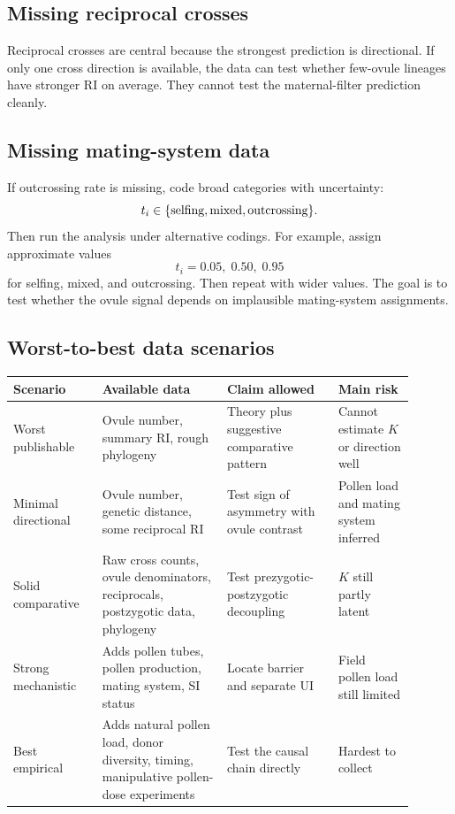 \documentclass[12pt]{article}
\begin{document}
\subsection{Missing reciprocal crosses}

Reciprocal crosses are central because the strongest prediction is directional. If only one cross direction is available, the data can test whether few-ovule lineages have stronger RI on average. They cannot test the maternal-filter prediction cleanly.

\subsection{Missing mating-system data}

If outcrossing rate is missing, code broad categories with uncertainty:
\begin{equation}
t_i\in\{\hbox{selfing},\hbox{mixed},\hbox{outcrossing}\}.
\end{equation}
Then run the analysis under alternative codings. For example, assign approximate values
\begin{equation}
t_i=0.05,\;0.50,\;0.95
\end{equation}
for selfing, mixed, and outcrossing. Then repeat with wider values. The goal is to test whether the ovule signal depends on implausible mating-system assignments.

\subsection{Worst-to-best data scenarios}

\begin{center}
\begin{tabular}{>{\raggedright\arraybackslash}p{0.20\linewidth} >{\raggedright\arraybackslash}p{0.28\linewidth} >{\raggedright\arraybackslash}p{0.25\linewidth} >{\raggedright\arraybackslash}p{0.17\linewidth}}
\toprule
Scenario & Available data & Claim allowed & Main risk \\
\midrule
Worst publishable & Ovule number, summary RI, rough phylogeny & Theory plus suggestive comparative pattern & Cannot estimate $K$ or direction well \\
Minimal directional & Ovule number, genetic distance, some reciprocal RI & Test sign of asymmetry with ovule contrast & Pollen load and mating system inferred \\
Solid comparative & Raw cross counts, ovule denominators, reciprocals, postzygotic data, phylogeny & Test prezygotic-postzygotic decoupling & $K$ still partly latent \\
Strong mechanistic & Adds pollen tubes, pollen production, mating system, SI status & Locate barrier and separate UI & Field pollen load still limited \\
Best empirical & Adds natural pollen load, donor diversity, timing, manipulative pollen-dose experiments & Test the causal chain directly & Hardest to collect \\
\bottomrule
\end{tabular}
\end{center}
\end{document}
